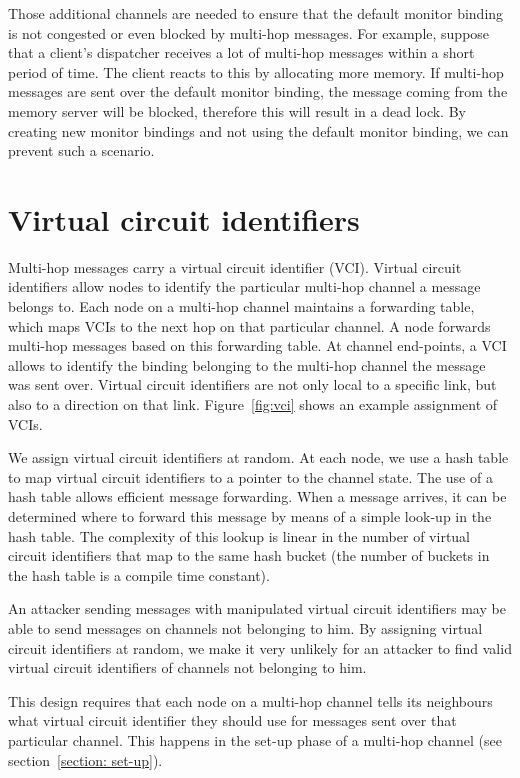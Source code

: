 \documentclass[a4paper,twoside]{report} %
\begin{document}
Those additional channels are needed to ensure that the default monitor binding is not congested or even blocked by multi-hop messages. For example, suppose that a client's dispatcher receives a lot of multi-hop messages within a short period of time. The client reacts to this by allocating more memory. If multi-hop messages are sent over the default monitor binding, the message coming from the memory server will be blocked, therefore this will result in a dead lock. By creating new monitor bindings and not using the default monitor binding, we can prevent such a scenario.


\section{Virtual circuit identifiers}
\label{section:vcis}
Multi-hop messages carry a virtual circuit identifier (VCI). Virtual circuit identifiers allow nodes to identify the particular multi-hop channel a message belongs to. Each node on a multi-hop channel maintains a forwarding table, which maps VCIs to the next hop on that particular channel. A node forwards multi-hop messages based on this forwarding table. At channel end-points, a VCI allows to identify the binding belonging to the multi-hop channel the message was sent over. Virtual circuit identifiers are not only local to a specific link, but also to a direction on that link. Figure~\ref{fig:vci} shows an example assignment of VCIs.

We assign virtual circuit identifiers at random. At each node, we use a hash table to map virtual circuit identifiers to a pointer to the channel state. The use of a hash table allows efficient message forwarding. When a message arrives, it can be determined where to forward this message by means of a simple look-up in the hash table. The complexity of this lookup is linear in the number of virtual circuit identifiers that map to the same hash bucket (the number of buckets in the hash table is a compile time constant).

An attacker sending messages with manipulated virtual circuit identifiers may be able to send messages on channels not belonging to him. By assigning virtual circuit identifiers at random, we make it very unlikely for an attacker to find valid virtual circuit identifiers of channels not belonging to him.

This design requires that each node on a multi-hop channel tells its neighbours what virtual circuit identifier they should use for messages sent over that particular channel. This happens in the set-up phase of a multi-hop channel (see section~\ref{section: set-up}).
\end{document}
